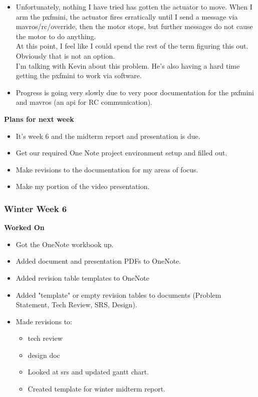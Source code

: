 \documentclass[compsoc,draftclsnofoot,onecolumn,10pt]{IEEEtran}
\begin{document}
\begin{itemize}
    \item Unfortunately, nothing I have tried has gotten the actuator to move. When I arm the pxfmini, the actuator fires erratically until I send a message via mavros/rc/override, then the motor stops, but further messages do not cause the motor to do anything.\\
    At this point, I feel like I could spend the rest of the term figuring this out. Obviously that is not an option.\\
    I'm talking with Kevin about this problem. He's also having a hard time getting the pxfmini to work via software.
    \item Progress is going very slowly due to very poor documentation for the pxfmini and mavros (an api for RC communication).
\end{itemize}
\textbf{Plans for next week}
\begin{itemize}
    \item It's week 6 and the midterm report and presentation is due.
    \item Get our required One Note project environment setup and filled out.
    \item Make revisions to the documentation for my areas of focus.
    \item Make my portion of the video presentation.
\end{itemize}


\subsubsection*{Winter Week 6}

\textbf{Worked On}
\begin{itemize}
    \item Got the OneNote workbook up.
    \item Added document and presentation PDFs to OneNote.
    \item Added revision table templates to OneNote
    \item Added "template" or empty revision tables to documents (Problem Statement, Tech Review, SRS, Design).
    \item Made revisions to:
    \begin{itemize}
        \item tech review
        \item design doc
        \item Looked at srs and updated gantt chart.
        \item Created template for winter midterm report.
    \end{itemize}
\end{itemize}
\end{document}
